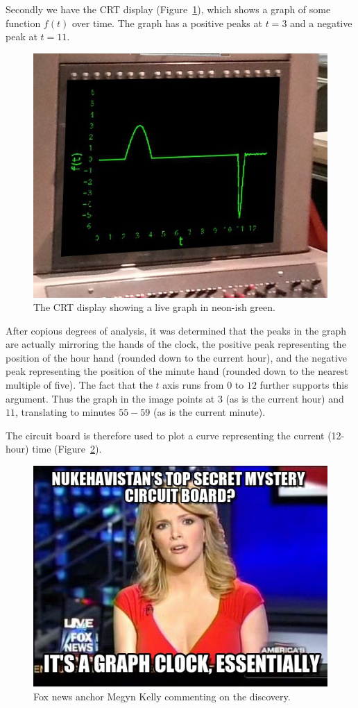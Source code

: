 Secondly we have the CRT display (Figure~\ref{fig:crt}), which shows a graph of some function $f(t)$ over time. The graph has a positive peaks at $t = 3$ and a negative peak at $t = 11$. 

\begin{figure}[h]
	\centering
	\includegraphics[width=0.8\columnwidth]{img/crt.jpg}
	\caption{The CRT display showing a live graph in neon-ish green.}
	\label{fig:crt}
\end{figure}

After copious degrees of analysis, it was determined that the peaks in the graph are actually mirroring the hands of the clock, the positive peak representing the position of the hour hand (rounded down to the current hour), and the negative peak representing the position of the minute hand (rounded down to the nearest multiple of five). The fact that the $t$ axis runs from $0$ to $12$ further supports this argument. Thus the graph in the image points at $3$ (as is the current hour) and $11$, translating to minutes $55-59$ (as is the current minute).

The circuit board is therefore used to plot a curve representing the current (12-hour) time (Figure~\ref{fig:essentially}).

\begin{figure}[h]
	\centering
	\includegraphics[width=0.8\columnwidth]{img/essentially.jpg}
	\caption{Fox news anchor Megyn Kelly commenting on the discovery.}
	\label{fig:essentially}
\end{figure}

